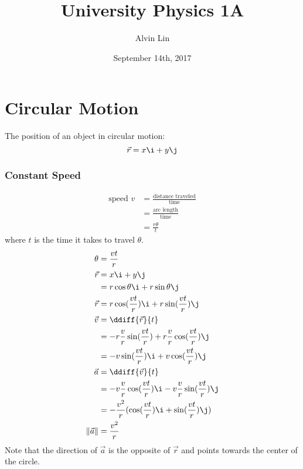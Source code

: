 \documentclass{math}
\title{University Physics 1A}
\author{Alvin Lin}
\date{September 14th, 2017}
\begin{document}
\maketitle

\section*{Circular Motion}
\begin{center}
\end{center}
The position of an object in circular motion:
\[ \vec{r} = x\i+y\j \]

\subsubsection*{Constant Speed}
\begin{align*}
  \text{speed } v &= \frac{\text{distance traveled}}{\text{time}} \\
  &= \frac{\text{arc length}}{\text{time}} \\
  &= \frac{r\theta}{t}
\end{align*}
where \( t \) is the time it takes to travel \( \theta \).
\begin{align*}
  \theta &= \frac{vt}{r} \\
  \vec{r} &= x\i+y\j \\
  &= r\cos\theta\i+r\sin\theta\j \\
  \vec{r} &= r\cos(\frac{vt}{r})\i+r\sin(\frac{vt}{r})\j \\
  \vec{v} &= \ddiff{\vec{r}}{t} \\
  &= -r\frac{v}{r}\sin(\frac{vt}{r})+r\frac{v}{r}\cos(\frac{vt}{r})\j \\
  &= -v\sin(\frac{vt}{r})\i+v\cos(\frac{vt}{r})\j \\
  \vec{a} &= \ddiff{\vec{v}}{t} \\
  &= -v\frac{v}{r}\cos(\frac{vt}{r})\i-v\frac{v}{r}\sin(\frac{vt}{r})\j \\
  &= -\frac{v^2}{r}(\cos(\frac{vt}{r})\i+\sin(\frac{vt}{r})\j) \\
  \|\vec{a}\| &= \frac{v^2}{r} \\
\end{align*}
Note that the direction of \( \vec{a} \) is the opposite of \( \vec{r} \) and
points towards the center of the circle.
\end{document}
